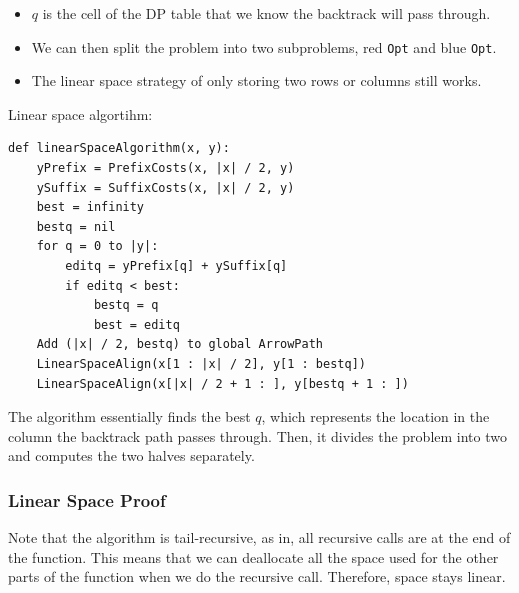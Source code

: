 \documentclass[10pt]{article}
\begin{document}
\begin{center}
\begin{itemize}
	\item $q$ is the cell of the DP table that we know the backtrack will pass through.
	\item We can then split the problem into two subproblems, red \texttt{Opt} and blue \texttt{Opt}.
	\item The linear space strategy of only storing two rows or columns still works.
\end{itemize}
\end{center}
Linear space algortihm:
\begin{verbatim}
def linearSpaceAlgorithm(x, y):
    yPrefix = PrefixCosts(x, |x| / 2, y)
    ySuffix = SuffixCosts(x, |x| / 2, y)
    best = infinity
    bestq = nil
    for q = 0 to |y|:
        editq = yPrefix[q] + ySuffix[q]
        if editq < best:
            bestq = q
            best = editq
    Add (|x| / 2, bestq) to global ArrowPath
    LinearSpaceAlign(x[1 : |x| / 2], y[1 : bestq])
    LinearSpaceAlign(x[|x| / 2 + 1 : ], y[bestq + 1 : ])
\end{verbatim}
The algorithm essentially finds the best $q$, which represents the location in the column the backtrack path passes through.  Then, it divides the problem into two and computes the two halves separately.

\subsubsection*{Linear Space Proof}
Note that the algorithm is tail-recursive, as in, all recursive calls are at the end of the function.  This means that we can deallocate all the space used for the other parts of the function when we do the recursive call.  Therefore, space stays linear.
\end{document}
